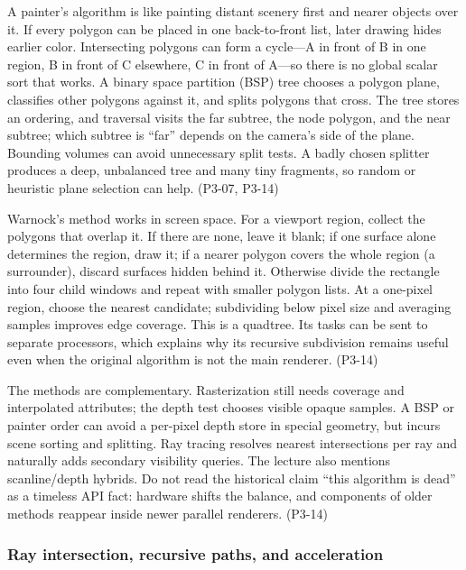 A painter's algorithm is like painting distant scenery first and nearer objects over it. If every polygon can be placed in one back-to-front list, later drawing hides earlier color. Intersecting polygons can form a cycle---A in front of B in one region, B in front of C elsewhere, C in front of A---so there is no global scalar sort that works. A binary space partition (BSP) tree chooses a polygon plane, classifies other polygons against it, and splits polygons that cross. The tree stores an ordering, and traversal visits the far subtree, the node polygon, and the near subtree; which subtree is ``far'' depends on the camera's side of the plane. Bounding volumes can avoid unnecessary split tests. A badly chosen splitter produces a deep, unbalanced tree and many tiny fragments, so random or heuristic plane selection can help. (P3-07, P3-14)

Warnock's method works in screen space. For a viewport region, collect the polygons that overlap it. If there are none, leave it blank; if one surface alone determines the region, draw it; if a nearer polygon covers the whole region (a surrounder), discard surfaces hidden behind it. Otherwise divide the rectangle into four child windows and repeat with smaller polygon lists. At a one-pixel region, choose the nearest candidate; subdividing below pixel size and averaging samples improves edge coverage. This is a quadtree. Its tasks can be sent to separate processors, which explains why its recursive subdivision remains useful even when the original algorithm is not the main renderer. (P3-14)

The methods are complementary. Rasterization still needs coverage and interpolated attributes; the depth test chooses visible opaque samples. A BSP or painter order can avoid a per-pixel depth store in special geometry, but incurs scene sorting and splitting. Ray tracing resolves nearest intersections per ray and naturally adds secondary visibility queries. The lecture also mentions scanline/depth hybrids. Do not read the historical claim ``this algorithm is dead'' as a timeless API fact: hardware shifts the balance, and components of older methods reappear inside newer parallel renderers. (P3-14)

\subsubsection{Ray intersection, recursive paths, and acceleration}\label{04-visual-computing-ii-ch029-ray-intersection-recursive-paths-and-acceleration}

